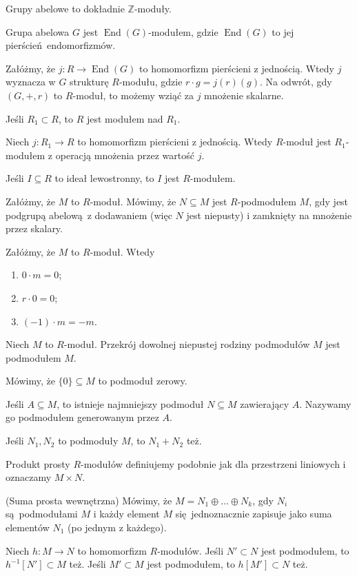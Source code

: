 \documentclass[a4paper, 12pt]{article}
\DeclareMathOperator{\End}{End}
\newcommand{\+}{\enspace}
\begin{document}
Grupy abelowe to dokładnie $ℤ$-moduły.

Grupa abelowa $G$ jest $\End(G)$-modułem,
gdzie $\End(G)$ to jej pierścień endomorfizmów.

Załóżmy, że $j: R → \End(G)$ to homomorfizm
pierścieni z jednością.
Wtedy $j$ wyznacza w $G$ strukturę $R$-modułu,
gdzie $r · g = j(r)(g)$.
Na odwrót, gdy $(G,+,r)$ to $R$-moduł, to
możemy wziąć za $j$ mnożenie skalarne.

Jeśli $R_1 ⊂ R$, to $R$ jest modułem nad $R_1$.

Niech $j: R_1 → R$ to homomorfizm pierścieni z jednością.
Wtedy $R$-moduł jest $R_1$-modułem z operacją mnożenia przez
wartość $j$.

Jeśli $I ⊆ R$ to ideał lewostronny,
to $I$ jest $R$-modułem.

Załóżmy, że $M$ to $R$-moduł.
Mówimy, że $N ⊆ M$ jest $R$-podmodułem $M$, gdy
jest podgrupą abelową z dodawaniem (więc $N$ jest niepusty)
i zamknięty na mnożenie przez skalary.

Załóżmy, że $M$ to $R$-moduł.
Wtedy
\begin{enumerate}
	\item $0·m = 0$;
	\item $r·0 = 0$;
	\item $(-1)·m = -m$.
\end{enumerate}

Niech $M$ to $R$-moduł.
Przekrój dowolnej niepustej rodziny podmodułów $M$
jest podmodułem $M$.

Mówimy, że $\{0\} ⊆ M$ to podmoduł zerowy.

Jeśli $A ⊆ M$, to istnieje najmniejszy
podmoduł $N ⊆ M$ zawierający $A$.
Nazywamy go podmodułem generowanym przez $A$.

Jeśli $N_1, N_2$ to podmoduły $M$, to $N_1 + N_2$ też.

Produkt prosty $R$-modułów definiujemy podobnie jak dla przestrzeni liniowych
i oznaczamy $M × N$.

(Suma prosta wewnętrzna) %
Mówimy, że $M = N_1 ⊕ … ⊕ N_k$, gdy $N_i$ są podmodułami $M$
i każdy element $M$ się jednoznacznie zapisuje jako suma
elementów $N_1$ (po jednym z każdego).

Niech $h: M → N$ to homomorfizm $R$-modułów.
Jeśli $N' ⊂ N$ jest podmodułem, to $h^{-1}[N'] ⊂ M$ też.
Jeśli $M' ⊂ M$ jest podmodułem, to $h[M'] ⊂ N$ też.
\end{document}
